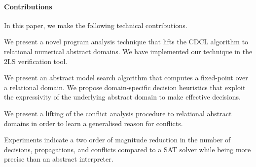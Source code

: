 \paragraph{Contributions}
In this paper, we make the following technical contributions.
%
\begin{compactenum}
\item We present a novel program analysis technique that 
lifts the CDCL algorithm to relational numerical abstract domains.   
We have implemented our technique in the 2LS verification tool.  

\item We present an abstract model search algorithm 
that computes a fixed-point over a relational domain.  We propose 
domain-specific decision heuristics that exploit the expressivity 
of the underlying abstract domain to make effective decisions. 

\item We present a lifting of the conflict analysis procedure 
to relational abstract domains in order to learn a generalised reason 
for conflicts.  
 
\item  Experiments indicate a two order of magnitude reduction 
in the number of decisions, propagations, and conflicts compared 
to a SAT solver while being more precise than an abstract interpreter.  
\end{compactenum}
